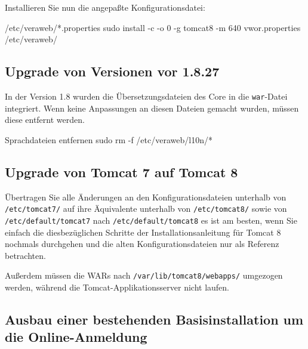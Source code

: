 \documentclass{tarentanleitung}
\newif\ifoa
\begin{document}
\begin{minipage}{\linewidth}
Installieren Sie nun die angepaßte Konfigurationsdatei:

\begin{lstdump}{/etc/veraweb/*.properties}
sudo install -c -o 0 -g tomcat8 -m 640 vwor.properties /etc/veraweb/
\end{lstdump}
\end{minipage}

\subsection{Upgrade von Versionen vor 1.8.27}\label{subsec:upgrade-1827}

\begin{minipage}{\linewidth}
In der Version 1.8 wurden die Übersetzungsdateien des Core in die
\texttt{war}-Datei integriert. Wenn keine Anpassungen an diesen Dateien
gemacht wurden, müssen diese entfernt werden.

\begin{lstdump}{Sprachdateien entfernen}
sudo rm -f /etc/veraweb/l10n/*
\end{lstdump}
\end{minipage}

\iffalse
Wenn Anpassungen gemacht wurden, müssen diese entsprechend angepasst
werden, wie es in \nameref{sec:l10n} beschrieben ist.
\fi

\subsection{Upgrade von Tomcat 7 auf Tomcat 8}

Übertragen Sie alle Änderungen an den Konfigurationsdateien
unterhalb von \texttt{/etc/tomcat7/} auf ihre Äquivalente
unterhalb von \texttt{/etc/tomcat8/} sowie von
\texttt{/etc/default/tomcat7} nach \texttt{/etc/default/tomcat8}
\dash es ist am besten, wenn Sie einfach die diesbezüglichen
Schritte der Installationsanleitung für Tomcat 8 nochmals
durchgehen und die alten Konfigurationsdateien nur als Referenz
betrachten.

Außerdem müssen die WARs nach \texttt{/var/lib/tomcat8/webapps/}
umgezogen werden, während die Tomcat-Applikationsserver nicht laufen.

\ifoa%

\subsection{Ausbau einer bestehenden Basisinstallation um die Online-Anmeldung}
\end{document}
